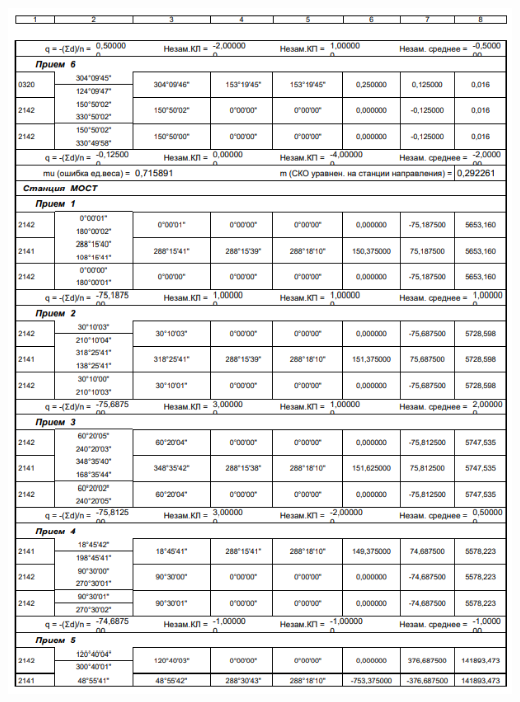 \documentclass[a4paper]{article}
\begin{document}
\begin{newpage}
\begin{center}
        \includegraphics[scale=1.4]{vedomosty/скп9.png}

\end{center}
\end{newpage}
\end{document}
